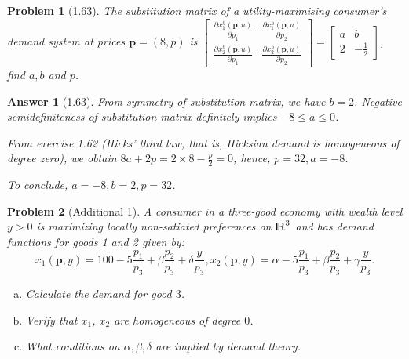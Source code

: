 \documentclass{article}
\newtheorem*{ans}{Answer}
\newtheorem*{prob}{{\bf Problem}}
\newcommand {\Reals}  {{\rm I \! R}}
\newcommand{\1}{{\bf 1}}
\newcommand{\0}{{\mathbf{0}}}
\newcommand{\p}{{\mathbf{p}}}
\newcommand{\<}{\langle}
\renewcommand{\>}{\rangle}
\begin{document}
\begin{prob}[1.63]  The substitution matrix of a utility-maximising consumer’s demand system at prices $\p = (8,p)$ is $ \begin{bmatrix}
	\frac{\partial x_1^h(\p,u)}{\partial p_1} & \frac{\partial x_1^h(\p,u)}{\partial p_2} \\	\frac{\partial x_2^h(\p,u)}{\partial p_1} & \frac{\partial x_2^h(\p,u)}{\partial p_2} 
	\end{bmatrix} = \begin{bmatrix}
	a & b \\ 2 & -\frac12
	\end{bmatrix}$, find $a,b$ and $p$.
\end{prob}
\begin{ans}[1.63]
	From symmetry of substitution matrix, we have $b = 2$. Negative semidefiniteness of substitution matrix definitely implies $-8 \le a \le 0$. 
	
	From exercise 1.62 (Hicks' third law, that is, Hicksian demand is homogeneous of degree zero), we obtain $8a+2p = 2\times 8 - \frac{p}2=0$, hence, $p=32,a=-8$.
	
	To conclude, $a= -8,b=2,p=32$.
\end{ans}
\begin{prob}[Additional 1]
	A consumer in a three-good economy with wealth level $y > 0$ is maximizing locally non-satiated preferences on $\Reals^3$ and has demand functions for goods 1 and 2 given by:
$$ x_1(\p,y)=100- 5\frac{p_1}{p_3}+ \beta \frac{p_2}{p_3 }+\delta \frac{y}{ p_3}, 
x_2(\p,y)=  \alpha - 5\frac{p_1}{p_3}+\beta \frac{p_2}{p_3}+ \gamma \frac{y}{p_3}.
$$
	\begin{enumerate}[(a)]
	\item Calculate the demand for good $3$.
	\item  Verify that $x_1$, $x_2$ are homogeneous of degree $0$.
	\item What conditions on $\alpha,\beta,\delta$ are implied by demand theory.
\end{enumerate}


	\end{prob}
\end{document}
